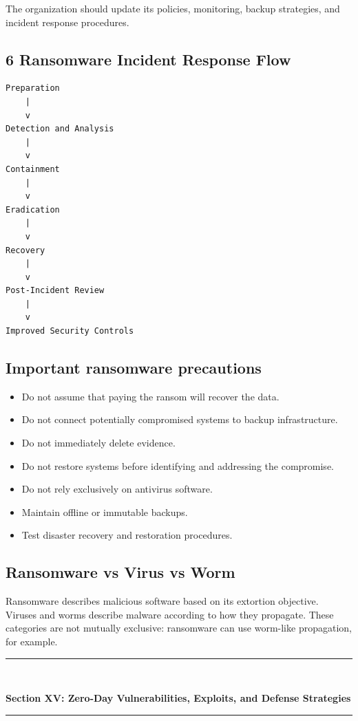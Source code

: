 The organization should update its policies, monitoring, backup strategies, and incident response procedures.

\subsection{6 Ransomware Incident Response Flow}

\begin{lstlisting}
Preparation
    |
    v
Detection and Analysis
    |
    v
Containment
    |
    v
Eradication
    |
    v
Recovery
    |
    v
Post-Incident Review
    |
    v
Improved Security Controls
\end{lstlisting}

\subsection{Important ransomware precautions}

\begin{itemize}
\item Do not assume that paying the ransom will recover the data.
\item Do not connect potentially compromised systems to backup infrastructure.
\item Do not immediately delete evidence.
\item Do not restore systems before identifying and addressing the compromise.
\item Do not rely exclusively on antivirus software.
\item Maintain offline or immutable backups.
\item Test disaster recovery and restoration procedures.
\end{itemize}

\subsection{Ransomware vs Virus vs Worm}

Ransomware describes malicious software based on its extortion objective. Viruses and worms describe malware according to how they propagate. These categories are not mutually exclusive: ransomware can use worm-like propagation, for example.


\newpage
\begin{center}
\vspace{0.5em}
{\color{primary}\rule{0.45\textwidth}{1.2pt}\\[4pt]}
{\Large\bfseries\color{primary} Section XV: Zero-Day Vulnerabilities, Exploits, and Defense Strategies\\[2pt]}
{\color{primary}\rule{0.45\textwidth}{1.2pt}}
\vspace{0.5em}
\end{center}

